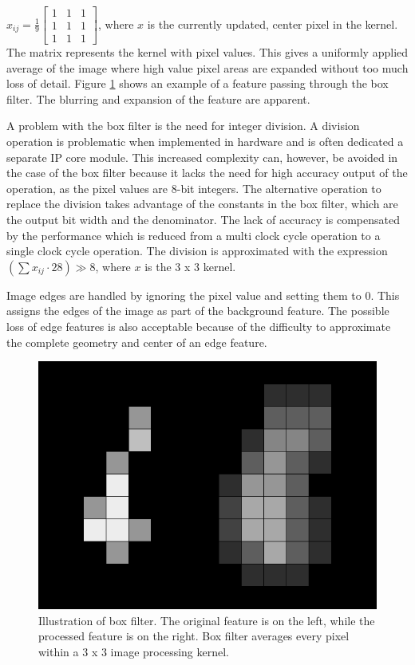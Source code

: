 \documentclass[12pt]{report}
\begin{document}
$x_{ij}=\frac{1}{9}
\begin{bmatrix}
1 & 1 & 1\\
1 & 1 & 1\\
1 & 1 & 1
\end{bmatrix}
$,
where $x$ is the currently updated, center pixel in the kernel. The matrix represents the kernel with pixel values. This gives a uniformly applied average of the image where high value pixel areas are expanded without too much loss of detail. Figure \ref*{fig:box_filter} shows an example of a feature passing through the box filter. The blurring and expansion of the feature are apparent.
\par
A problem with the box filter is the need for integer division. A division operation is problematic when implemented in hardware and is often dedicated a separate IP core module. This increased complexity can, however, be avoided in the case of the box filter because it lacks the need for high accuracy output of the operation, as the pixel values are 8-bit integers. The alternative operation to replace the division takes advantage of the constants in the box filter, which are the output bit width and the denominator. The lack of accuracy is compensated by the performance which is reduced from a multi clock cycle operation to a single clock cycle operation. The division is approximated with the expression
$
(\sum x_{ij} \cdot 28) \gg 8 
$, where $x$ is the 3 x 3 kernel.
\par
Image edges are handled by ignoring the pixel value and setting them to 0. This assigns the edges of the image as part of the background feature. The possible loss of edge features is also acceptable because of the difficulty to approximate the complete geometry and center of an edge feature.

\begin{figure}[h]
    \centering
    \includegraphics[scale=0.25]{figures/box_filter.png}
    \caption{Illustration of box filter. The original feature is on the left, while the processed feature is on the right. Box filter averages every pixel within a 3 x 3 image processing kernel.}
    \label{fig:box_filter}
\end{figure}
\end{document}
